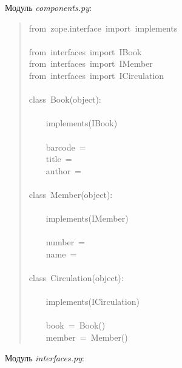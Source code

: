 \documentclass[14pt,a4paper,openany,twoside,final]{extbook}
\providecommand*{\DUroletitlereference}[1]{\textsl{#1}}
\begin{document}
Модуль \DUroletitlereference{components.py}:

\begin{quote}{\ttfamily \raggedright \noindent
from~zope.interface~import~implements\\
~\\
from~interfaces~import~IBook\\
from~interfaces~import~IMember\\
from~interfaces~import~ICirculation\\
~\\
class~Book(object):\\
~\\
~~~~implements(IBook)\\
~\\
~~~~barcode~=~\textquotedbl{}\textquotedbl{}\\
~~~~title~=~\textquotedbl{}\textquotedbl{}\\
~~~~author~=~\textquotedbl{}\textquotedbl{}\\
~\\
class~Member(object):\\
~\\
~~~~implements(IMember)\\
~\\
~~~~number~=~\textquotedbl{}\textquotedbl{}\\
~~~~name~=~\textquotedbl{}\textquotedbl{}\\
~\\
class~Circulation(object):\\
~\\
~~~~implements(ICirculation)\\
~\\
~~~~book~=~Book()\\
~~~~member~=~Member()
}
\end{quote}

Модуль \DUroletitlereference{interfaces.py}:
\end{document}

